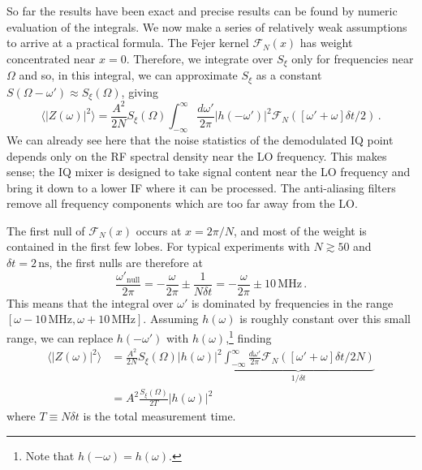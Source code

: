 So far the results have been exact and precise results can be found by numeric evaluation of the integrals.
We now make a series of relatively weak assumptions to arrive at a practical formula.
The Fejer kernel $\mathcal{F}_N(x)$ has weight concentrated near $x=0$.
Therefore, we integrate over $S_\xi$ only for frequencies near $\Omega$ and so, in this integral, we can approximate $S_\xi$ as a constant $S(\Omega - \omega') \approx S_\xi(\Omega)$, giving
\begin{equation}
\langle |Z(\omega)|^2 \rangle =
\frac{A^2}{2N} S_\xi(\Omega) \int_{-\infty}^\infty \frac{d\omega'}{2\pi} |h(-\omega')|^2 \mathcal{F}_N([\omega' + \omega]\delta t / 2) \, .
\end{equation}
We can already see here that the noise statistics of the demodulated IQ point depends only on the RF spectral density near the LO frequency.
This makes sense; the IQ mixer is designed to take signal content near the LO frequency and bring it down to a lower IF where it can be processed.
The anti-aliasing filters remove all frequency components which are too far away from the LO.

The first null of $\mathcal{F}_N(x)$ occurs at $x = 2\pi / N$, and most of the weight is contained in the first few lobes.
For typical experiments with $N \gtrsim 50$ and $\delta t = 2 \, \text{ns}$, the first nulls are therefore at
\begin{equation}
\frac{\omega'_{\text{null}}}{2\pi}
= - \frac{\omega}{2\pi} \pm \frac{1}{N \delta t}
= - \frac{\omega}{2\pi} \pm 10 \, \text{MHz} \, .
\end{equation}
This means that the integral over $\omega'$ is dominated by frequencies in the range $[\omega - 10\,\text{MHz}, \omega + 10 \, \text{MHz}]$.
Assuming $h(\omega)$ is roughly constant over this small range, we can replace $h(-\omega')$ with $h(\omega)$,\footnote{Note that $h(-\omega) = h(\omega)$.} finding
\begin{align}
\langle |Z(\omega)|^2 \rangle
&= \frac{A^2}{2N}S_\xi(\Omega)|h(\omega)|^2
\underbrace{
\int_{-\infty}^\infty \frac{d\omega'}{2\pi} \mathcal{F}_N([\omega' + \omega] \delta t / 2 N)
}_{1 / \delta t} \\
&= A^2 \frac{S_\xi(\Omega)}{2 T} |h(\omega)|^2
\end{align}
where $T \equiv N \delta t$ is the total measurement time.


